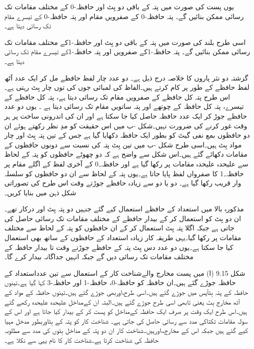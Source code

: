 یوں  پست    کی صورت میں  پتہ کے  باقی دو بِٹ   اور  حافظہ-0 کے مختلف مقامات تک رسائی ممکن بنائیں گے۔ پتہ   حافظہ-0 کے صفرویں  مقام اور  پتہ   حافظہ-0 کے تیسرے مقام تک رسائی دیتا ہے۔



اسی طرح  بلند    کی صورت میں  پتہ کے  باقی دو بِٹ   اور  حافظہ-1کے مختلف مقامات تک رسائی ممکن بنائیں گے۔ پتہ   حافظہ-1کے صفرویں   اور  پتہ   حافظہ-1کے تیسرے مقام تک رسائی دیتا ہے۔


گزشتہ دو   نثر پاروں  کا خلاصہ درج ذیل ہے۔ دو عدد چار  لفظ حافظے مل کر ایک عدد آٹھ  لفظ  حافظے کے طور  پر کام کرتے ہیں۔الفاظ کی لمبائی جوں کی توں چار بِٹ  رہتی ہے۔اس طرح  پتہ   کل حافظے کے صفرویں مقام تک رسائی دیتا ہے، پتہ   کل حافظے کے تیسرے، پتہ   کل حافظہ کے چوتھے  اور پتہ    ساتویں مقام تک رسائی دیتا ہے ۔ یوں دو عدد حافظے جوڑ کر ایک عدد حافظہ حاصل کیا جا سکتا ہے اور ان کی اندرونی ساخت پر ہر وقت غور کرنے کی ضرورت نہیں۔شکل -ب  میں اس حقیقت کو مدِ نظر رکھتے ہوئے ان دو حافظوں بمع نفی گیٹ کو بطور ایک   حافظہ دکھایا گیا ہے جس کے تین پتہ  بِٹ اور چار مواد  بِٹ ہیں۔اسی طرح  شکل -ب  میں تین بِٹ پتہ کی نسبت سے دونوں حافظوں کے مقامات دکھائے گئے ہیں۔اس شکل سے واضح ہے کہ دو چھوٹے حافظوں کو پتہ کے لحاظ سے علیحدہ علیحدہ مقامات پر رکھا گیا ہے اور حافظہ۔0 کے آخری لفظ کے اگلے مقام پر حافظہ۔1 کا صفرواں لفظ پایا جاتا ہے۔یوں پتہ کے لحاظ سے ان دو  حافظوں کو سلسلہ وار قریب رکھا گیا ہے۔ دو یا دو سے زیادہ حافظے جوڑتے وقت اس طرح کی تصوراتی شکل ذہن میں بنایا کریں۔
	
مذکورہ بالا  میں   استعداد کے حافظے استعمال کیے گئے جنہیں دو پتہ بِٹ    اور   درکار تھے۔ان دو بِٹ کو استعمال کر کے بیدار حافظے کے مختلف مقامات تک رسائی حاصل کی جاتی ہے جبکہ اگلا پتہ بِٹ   استعمال کر کے ان حافظوں کو پتہ کے لحاظ سے مختلف مقامات پر رکھا گیا۔یہی طریقہ کار زیادہ استعداد کے حافظوں کے ساتھ بھی استعمال کیا جا سکتا ہے۔یوں دو عدد دس بِٹ پتہ  کے    حافظے  جوڑتے وقت   تا   بیدار حافظہ کے مختلف مقامات تک رسائی دیں گے جبکہ  انہیں جداگانہ بیدار کرے گا۔ 


	شکل 9.15 (ا) میں پست مخارج والےشناخت کار کے استعمال سے تین عدداستعداد کے حافظہ جوڑے گئے ہیں۔ان حافظہ کو حافظہ-0، حافظہ-1 اور حافظہ-3 کہا گیا ہے۔تینوں حافظہ کے پتہ بِٹآپس میں جوڑے گئے ہیں۔اسی طرح،اوربھی جوڑے گئے ہیں۔تینوں حافظہ کے مواد کے آٹھ مخارج بِٹ یعنی تابھی اسی طرح جوڑے گئے ہیں۔البتہ ان کےمداخل علیحدہ علیحدہ رکھے گئے ہیں۔اس طرح ایک وقت پر صرف ایک حافظہ کےمداخل کو پست کر کے بیدار کیا جاتا ہے اور اس کے سولہ مقامات تکتاکی مدد سے رسائی حاصل کی جاتی ہے۔
	 شناخت کار کو پتہ کے بِٹاوربطور مدخل مہیا کیے گئے ہیں جبکہ اس کے مخارج،،اورہیں۔شناخت کار ان دو پتہ کے مداخل بِٹوں کی مدد سے مطلوبہ حافظہ کی شناخت کرتا ہے۔شناخت کار کا نام یہی سے نکلا ہے۔


